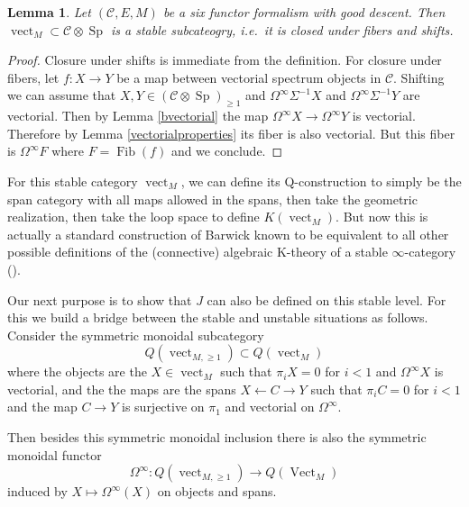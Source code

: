 \documentclass[12pt]{article}
\newtheorem{lemma}[theorem]{Lemma}
\newcommand{\on}{\operatorname}
\newcommand{\mc}{\mathcal}
\begin{document}
\begin{lemma}\label{vectstable}
Let $(\mc{C},E,M)$ be a six functor formalism with good descent.  Then $\on{vect}_M\subset \mathcal{C}\otimes\on{Sp}$ is a stable subcateogry, i.e.\ it is closed under fibers and shifts.
\end{lemma}
\begin{proof}
Closure under shifts is immediate from the definition.  For closure under fibers, let $f:X\to Y$ be a map between vectorial spectrum objects in $\mc{C}$.  Shifting we can assume that $X,Y\in (\mc{C}\otimes\on{Sp})_{\geq 1}$ and $\Omega^\infty\Sigma^{-1}X$ and $\Omega^\infty\Sigma^{-1}Y$ are vectorial.  Then by Lemma \ref{bvectorial} the map $\Omega^\infty X \to \Omega^\infty  Y$ is vectorial.  Therefore by Lemma \ref{vectorialproperties} its fiber is also vectorial. But this fiber is $\Omega^\infty F$ where $F=\on{Fib}(f)$ and we conclude.
\end{proof}

For this stable category $\on{vect}_M$, we can define its Q-construction to simply be the span category with all maps allowed in the spans, then take the geometric realization, then take the loop space to define $K(\on{vect}_M)$.  But now this is actually a standard construction of Barwick known to be equivalent to all other possible definitions of the (connective) algebraic K-theory of a stable $\infty$-category (\cite{BarwickQ}).

Our next purpose is to show that $J$ can also be defined on this stable level.  For this we build a bridge between the stable and unstable situations as follows.  Consider the symmetric monoidal subcategory
$$Q(\on{vect}_{M,\geq 1})\subset Q(\on{vect}_M)$$
where the objects are the $X\in\on{vect}_M$ such that $\pi_iX=0$ for $i<1$ and $\Omega^\infty X$ is vectorial, and the the maps are the spans $X\leftarrow C\to Y$ such that $\pi_iC=0$ for $i<1$ and the map $C\to Y$ is surjective on $\pi_1$ and vectorial on $\Omega^\infty$. 

Then besides this symmetric monoidal inclusion there is also the symmetric monoidal functor
$$\Omega^\infty: Q(\on{vect}_{M,\geq 1})\to Q(\on{Vect}_M)$$
induced by $X\mapsto \Omega^\infty(X)$ on objects and spans.
\end{document}
